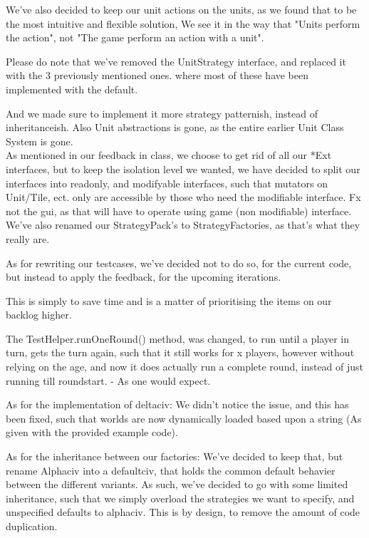 We've also decided to keep our unit actions on the units, as we found that to be the most intuitive and flexible solution,
We see it in the way that "Units perform the action", not "The game perform an action with a unit".

Please do note that we've removed the UnitStrategy interface, and replaced it
with the 3 previously mentioned ones. where most of these have been implemented with the default.

And we made sure to implement it more strategy patternish, instead of inheritanceish. 
Also Unit abstractions is gone, as the entire earlier Unit Class System is gone.
\\

As mentioned in our feedback in class, we choose to get rid of all our *Ext interfaces, but to keep the isolation level we wanted, we have decided to split our
interfaces into readonly, and modifyable interfaces, such that mutators on Unit/Tile, ect. only are accessible by those who need the modifiable interface.
Fx not the gui, as that will have to operate using game (non modifiable) interface.
\\

We've also renamed our StrategyPack's to StrategyFactories, as that's what they
really are.

As for rewriting our testcases, we've decided not to do so, for the current
code, but instead to apply the feedback, for the upcoming iterations. 

This is simply to save time and is a matter of prioritising the items on our backlog higher.


The TestHelper.runOneRound() method, was changed, to run until a player in
turn, gets the turn again, such that it still works for x players, however
without relying on the age, and now it does actually run a complete round,
instead of just running till roundstart. - As one would expect.


As for the implementation of deltaciv:
We didn't notice the issue, and this has been fixed, such that worlds are now dynamically loaded based upon a string (As given with the provided example code).

    
As for the inheritance between our factories:
We've decided to keep that, but rename Alphaciv into a defaultciv, that holds the common default behavier between the different variants. 
As such, we've decided to go with some limited inheritance, such that we simply overload the strategies we want to specify, and unspecified defaults to alphaciv.
This is by design, to remove the amount of code duplication.



